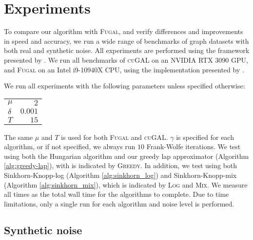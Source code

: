 
\section{Experiments}
To compare our algorithm with \textsc{Fugal}, and verify differences and improvements in speed and accuracy, we run a wide range of benchmarks of graph datasets with both real and synthetic noise. All experiments are performed using the framework presented by \cite{skitsas2023GAEval}. We run all benchmarks of \textsc{cuGAL} on an NVIDIA RTX 3090 GPU, and \textsc{Fugal} on an Intel i9-10940X CPU, using the implementation presented by \cite{fugal2024}.

We run all experiments with the following parameters unless specified otherwise:
\begin{table}[htbp]
    \begin{center}
        \begin{tabular}{ |l|r| }
            \hline
            $\mu$    & $2$     \\
            $\delta$ & $0.001$ \\
            $T$      & $15$    \\
            \hline
        \end{tabular}
    \end{center}
\end{table}

The same $\mu$ and $T$ is used for both \textsc{Fugal} and \textsc{cuGAL}. $\gamma$ is specified for each algorithm, or if not specified, we always run $10$ Frank-Wolfe iterations. We test using both the Hungarian algorithm and our greedy lap approximator (Algorithm \ref{alg:greedy-lap}), with is indicated by \textsc{Greedy}. In addition, we test using both Sinkhorn-Knopp-log (Algorithm \ref{alg:sinkhorn_log}) and Sinkhorn-Knopp-mix (Algorithm \ref{alg:sinkhorn_mix}), which is indicated by \textsc{Log} and \textsc{Mix}. We measure all times as the total wall time for the algorithms to complete. Due to time limitations, only a single run for each algorithm and noise level is performed.

\subsection{Synthetic noise}
\indent
{}

